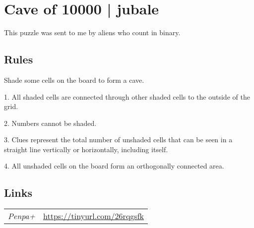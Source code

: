 \section{Cave of 10000 | {\normalfont jubale}}
\label{sec:58-cave-of-10000-jubale}
This puzzle was sent to me by aliens who count in binary.
\subsection*{Rules}
\begin{markdown}
Shade some cells on the board to form a cave.



1. All shaded cells are connected through other shaded cells to the outside of the grid.



2. Numbers cannot be shaded.



3. Clues represent the total number of unshaded cells that can be seen in a straight line vertically or horizontally, including itself.



4. All unshaded cells on the board form an orthogonally connected area.
\end{markdown}
\subsection*{Links}
\begin{tabularx}{\textwidth}{l X}
\emph{Penpa+} & \url{https://tinyurl.com/26rqgsfk} \\
\end{tabularx}
\pagebreak

